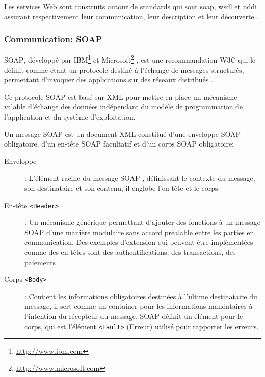 	Les services Web sont construits autour de standards qui sont \acrshort{soap}, \acrshort{wsdl} et \acrshort{uddi} 
	assurant respectivement leur communication, leur description et leur découverte .

	\subsubsection{Communication: SOAP}
		\textsc{SOAP}, développé par IBM\footnote{\url{http://www.ibm.com}} et
		Microsoft\footnote{\url{http://www.microsoft.com}} \cite{box2000simple}, est une recommandation \textsc{W3C} 
		qui le définit comme étant un protocole destiné à l'échange de messages structurés, permettant 
		d'invoquer des applications sur des réseaux distribués \cite{mitra2003soap}.

		Ce protocole \textsc{SOAP} est basé sur \textsc{XML} pour mettre en place un mécanisme valable
		d'échange des données indépendant du modèle de programmation de l'application et du système
		d’exploitation.

	      	Un message \textsc{SOAP} est un document XML constitué d'une enveloppe \textsc{SOAP} obligatoire, 
		d'un en-tête \textsc{SOAP} facultatif et d'un corps \textsc{SOAP} obligatoire:



		\SpecialItem
		\begin{description} %
		    \item[Enveloppe]:  
			L'élément racine du message \textsc{SOAP} , définissant le contexte du message, son
		       destinataire et son contenu, il englobe l'en-tête et le corps.

		    \item[En-tête \texttt{<Header>}]:
		       	Un mécanisme générique permettant d'ajouter des fonctions à un message
			\textsc{SOAP} d'une manière modulaire sans accord préalable entre les parties en communication. 
			Des exemples d'extension qui peuvent être implémentées comme des en-têtes sont des 
			authentifications, des transactions, des paiements

		    \item[Corps \texttt{<Body>}]: 
			Contient les informations obligatoires destinées à l'ultime destinataire du message, il sert 
			comme un container pour les informations mandataires à l'intention du récepteur du message.
			\textsc{SOAP} définit un élément pour le corps, qui est l'élément \texttt{<Fault>} (Erreur) 
			utilisé pour rapporter les erreurs.
		\end{description}

